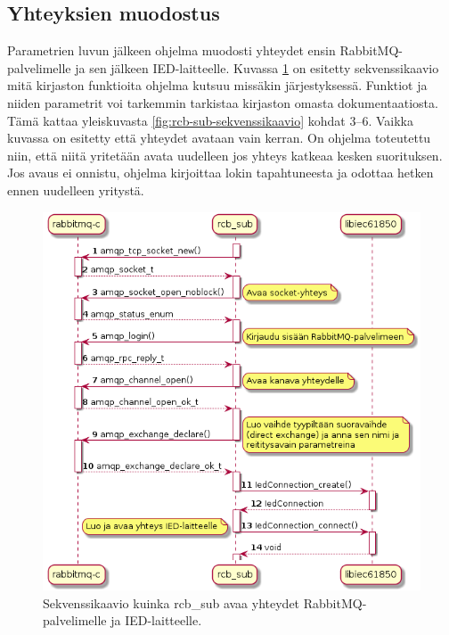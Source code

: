 \subsection{Yhteyksien muodostus}
Parametrien luvun jälkeen ohjelma muodosti yhteydet ensin RabbitMQ-palvelimelle ja sen jälkeen IED-laitteelle. Kuvassa \ref{fig:rcb-sub-open-connections} on esitetty sekvenssikaavio mitä kirjaston funktioita ohjelma kutsuu missäkin järjestyksessä. Funktiot ja niiden parametrit voi tarkemmin tarkistaa kirjaston omasta dokumentaatiosta. Tämä kattaa yleiskuvasta \ref{fig:rcb-sub-sekvenssikaavio} kohdat 3--6. Vaikka kuvassa on esitetty että yhteydet avataan vain kerran. On ohjelma toteutettu niin, että niitä yritetään avata uudelleen jos yhteys katkeaa kesken suorituksen. Jos avaus ei onnistu, ohjelma kirjoittaa lokin tapahtuneesta ja odottaa hetken ennen uudelleen yritystä.

\begin{figure}[ht!]
	\includegraphics[width=1\textwidth]{pictures/rcb-sub-open-connections.png}
	\caption{Sekvenssikaavio kuinka rcb\_sub avaa yhteydet RabbitMQ-palvelimelle ja IED-laitteelle.}
	\label{fig:rcb-sub-open-connections}
\end{figure}

